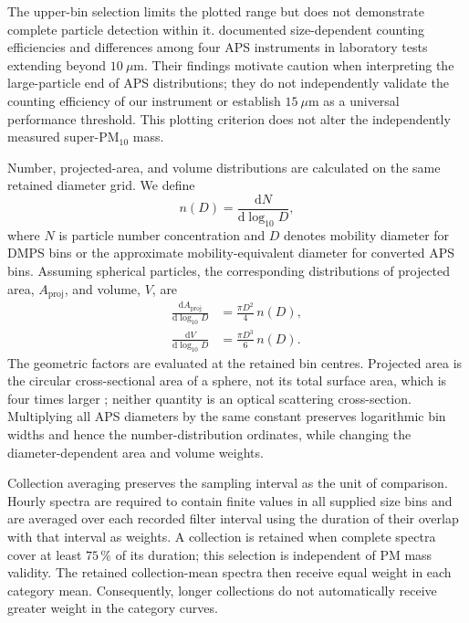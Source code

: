 The upper-bin selection limits the plotted range but does not
demonstrate complete particle detection within it.
\citet{vasilatou2023} documented size-dependent counting
efficiencies and differences among four APS instruments in
laboratory tests extending beyond \(10~\mu\mathrm{m}\).
Their findings motivate caution when interpreting the large-particle
end of APS distributions; they do not independently validate the
counting efficiency of our instrument or establish
\(15~\mu\mathrm{m}\) as a universal performance threshold.
This plotting criterion does not alter the independently
measured super-PM$_{10}$ mass.

Number, projected-area, and volume distributions are calculated
on the same retained diameter grid. We define
\begin{equation}
n(D) = \frac{\mathrm{d}N}{\mathrm{d}\log_{10}D},
\end{equation}
where \(N\) is particle number concentration and \(D\) denotes
mobility diameter for DMPS bins or the approximate
mobility-equivalent diameter for converted APS bins. Assuming
spherical particles, the corresponding distributions of projected
area, \(A_{\mathrm{proj}}\), and volume, \(V\), are
\begin{align}
\frac{\mathrm{d}A_{\mathrm{proj}}}{\mathrm{d}\log_{10}D}
&= \frac{\pi D^2}{4}\,n(D),\\
\frac{\mathrm{d}V}{\mathrm{d}\log_{10}D}
&= \frac{\pi D^3}{6}\,n(D).
\end{align}
The geometric factors are evaluated at the retained bin centres.
Projected area is the circular cross-sectional area of a sphere,
not its total surface area, which is four times larger
\citep{seinfeld2016}; neither quantity is an optical scattering
cross-section. Multiplying all APS diameters by the same constant
preserves logarithmic bin widths and hence the number-distribution
ordinates, while changing the diameter-dependent area and volume
weights.

Collection averaging preserves the sampling interval as the unit
of comparison. Hourly spectra are required to contain finite
values in all supplied size bins and are averaged over each
recorded filter interval using the duration of their overlap
with that interval as weights. A collection is retained when
complete spectra cover at least \(75\,\%\) of its duration;
this selection is independent of PM mass validity. The retained
collection-mean spectra then receive equal weight in each
category mean. Consequently, longer collections do not
automatically receive greater weight in the category curves.

